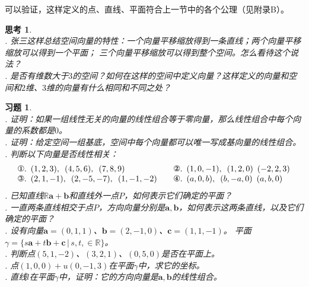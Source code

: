 \documentclass[12pt,UTF8]{ctexbook}
\newtheorem{sk}{思考}[section]
\newtheorem{xt}{习题}[section]
\begin{document}
可以验证，这样定义的点、直线、平面符合上一节中的各个公理（见附录B）。

\begin{sk}
    \mbox{}  \\
    . 张三这样总结空间向量的特性：一个向量平移缩放得到一条直线；两个向量平移缩放可以得到一个平面；
    三个向量平移缩放可以得到整个空间。怎么看待这个说法？\\
    . 是否有维数大于$3$的空间？如何在这样的空间中定义向量？这样定义的向量和空间和$2$维、$3$维的向量有什么相同和不同之处？
\end{sk}

\begin{xt}
    \mbox{}  \\
    . 证明：如果一组线性无关的向量的线性组合等于零向量，那么线性组合中每个向量的系数都是$0$。\\
    . 证明：给定空间一组基底，空间中每个向量都可以唯一写成基向量的线性组合。\\
    . 判断以下向量是否线性相关：\\
    $$
    \begin{array}{ll}
        \mbox{\ding{172}}.\,\,\, (1,2,3),\,\,\,(4,5,6), \,\,\,(7,8,9) \quad & \mbox{\ding{173}}.\,\,\, (1,0,-1),\,\,\, (1,2,0) \,\,\,(-2,2,3)  \\
        \mbox{\ding{174}}.\,\,\, (2,1,-1), \,\,\, (2,-5,-7), \,\,\,(1,-1,-2) \quad & \mbox{\ding{175}}.\,\,\, (a,0,b),\,\,\, (b,-a,0) \,\,\,(a,b,0) 
    \end{array}
    $$
    . 已知直线$\mathbb{R}\mathbf{a}+\mathbf{b}$和直线外一点$P$，如何表示它们确定的平面？\\
    . 一直两条直线相交于点$P$，方向向量分别是$\mathbf{a},\mathbf{b}$，如何表示这两条直线，以及它们确定的平面？\\
    . 设有向量$\mathbf{a}=(0,1,1)$、$\mathbf{b}=(2,-1,0)$、$\mathbf{c}=(1,1,-1)$。
    平面$\gamma = \{s\mathbf{a} + t\mathbf{b} + \mathbf{c} \, | \, s,t,\in\mathbb{R}\}$。\\
    . 判断点$(5,1,-2)$、$(3,2,1)$、$(0,5,0)$是否在平面上。\\
    . 点$(1,0,0)+u(0,-1,3)$在平面$\gamma$中，求它的坐标。\\
    . 直线$l$在平面$\gamma$中，证明：它的方向向量是$\mathbf{a},\mathbf{b}$的线性组合。
\end{xt}
\end{document}
